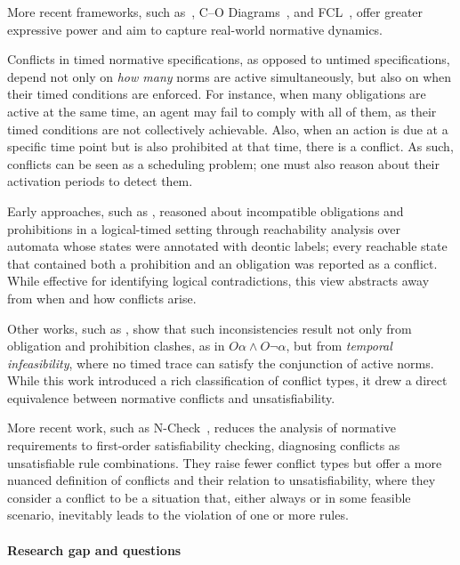 More recent frameworks, such as~\cite{HvitvedKZ12}, C--O Diagrams~\cite{camilleri2014cnl}, and FCL~\cite{farmer2016fcl}, offer greater expressive power and aim to capture real-world normative dynamics.

Conflicts in timed normative specifications, as opposed to untimed specifications, depend not only on \emph{how many} norms are active simultaneously, but also on when their timed conditions are enforced. For instance, when many obligations are active at the same time, an agent may fail to comply with all of them, as their timed conditions are not collectively achievable. Also, when an action is due at a specific time point but is also prohibited at that time, there is a conflict. As such, conflicts can be seen as a scheduling problem; one must also reason about their activation periods to detect them.






Early approaches, such as \cite{fenech2009automatic}, reasoned about incompatible obligations and prohibitions in a logical-timed setting through reachability analysis over automata whose states were annotated with deontic labels; every reachable state that contained both a prohibition and an obligation was reported as a conflict.  While effective for identifying logical contradictions, this view abstracts away from when and how conflicts arise.

 Other works, such as \cite{colombo2014detecting}, show that such inconsistencies result not only from obligation and prohibition clashes, as in $O\alpha \land O\lnot\alpha$, but from \emph{temporal infeasibility}, where no timed trace can satisfy the conjunction of active norms. While this work introduced a rich classification of conflict types, it drew a direct equivalence between normative conflicts and unsatisfiability.

More recent work, such as N-Check~\cite{10.1145/3597503.3639093}, reduces the analysis of normative requirements to first-order satisfiability checking, diagnosing conflicts as unsatisfiable rule combinations. They raise fewer conflict types but offer a more nuanced definition of conflicts and their relation to unsatisfiability, where they consider a conflict to be a situation that, either always or in some feasible scenario, inevitably leads to the violation of one or more rules.

\paragraph{Research gap and questions}

